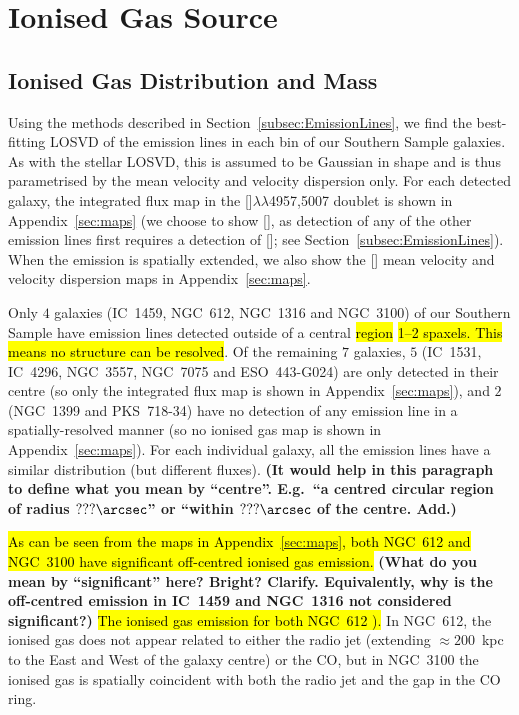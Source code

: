 \documentclass[a4paper,fleqn,usenatbib]{mnras}
\DeclareRobustCommand{\removed}[1]{{\sethlcolor{red}\hl{#1}}}
\DeclareRobustCommand{\added}[1]{{\sethlcolor{green}\hl{#1}}}
\begin{document}
\section{Ionised Gas Source}
\label{sec:gas}

\subsection{Ionised Gas Distribution and Mass}
\label{subsec:gas_mass}

Using the methods described in Section~\ref{subsec:EmissionLines}, we
find the best-fitting LOSVD of the emission lines in each bin of our
Southern Sample galaxies. As with the stellar LOSVD, this is assumed
to be Gaussian in shape and is thus parametrised by the mean velocity
and velocity dispersion only. For each detected galaxy, the integrated
flux map in the []$\lambda\lambda$4957,5007 doublet is
shown in Appendix~\ref{sec:maps} (we choose to show [], as
detection of any of the other emission lines first requires a
detection of []; see
Section~\ref{subsec:EmissionLines}). When the emission is spatially
extended, we also show the [] mean velocity and velocity
dispersion maps in Appendix~\ref{sec:maps}.

Only $4$ galaxies (IC~1459, NGC~612, NGC~1316 and NGC~3100) of our
Southern Sample have emission lines detected outside of a central
\removed{region} \added{1--2 spaxels. This means no structure can be
 resolved}. Of the remaining $7$ galaxies, $5$ (IC~1531, IC~4296,
NGC~3557, NGC~7075 and ESO~443-G024) are only detected in their centre
(so only the integrated flux map is shown in Appendix~\ref{sec:maps}),
and $2$ (NGC~1399 and PKS~718-34) have no detection of any emission
line in a spatially-resolved manner (so no ionised gas map is shown in
Appendix~\ref{sec:maps}). For each individual galaxy, all the emission
lines have a similar distribution (but different fluxes). {\bf (It
  would help in this paragraph to define what you mean by
  ``centre''. E.g.\ ``a centred circular region of radius
  $???\arcsec$'' or ``within $???\arcsec$ of the centre. Add.)}

\removed{As can be seen from the maps in Appendix~\ref{sec:maps}, 
both NGC~612 and NGC~3100 have significant off-centred ionised 
gas emission.} {\bf (What do you mean by ``significant'' here? Bright?
  Clarify. Equivalently, why is the off-centred emission in IC~1459
  and NGC~1316 not considered significant?)} 
\added{The ionised gas emission for both NGC~612 ).} In NGC~612, 
the ionised gas does not appear related to either the radio jet 
(extending $\approx200$~kpc to the East and West of the galaxy 
centre) or the CO, but in NGC~3100 the ionised gas is spatially 
coincident with both the radio jet and the gap in the CO ring.
\end{document}
